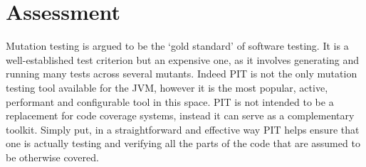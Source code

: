 \documentclass[a4paper]{article}
\begin{document}
\section{Assessment}
Mutation testing is argued to be the `gold standard' of software testing. It is a well-established test criterion but an expensive one, as it involves generating and running many tests across several mutants. Indeed PIT is not the only mutation testing tool available for the JVM, however it is the most popular, active, performant and configurable tool in this space. PIT is not intended to be a replacement for code coverage systems, instead it can serve as a complementary toolkit. Simply put, in a straightforward and effective way PIT helps ensure that one is actually testing and verifying all the parts of the code that are assumed to be otherwise covered. 


\vspace{-7.5mm}
\renewcommand{\refname}{\section*{References}}

\end{document}
